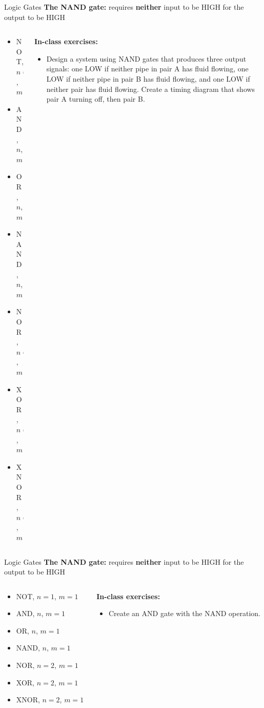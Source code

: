 \documentclass{beamer}
\begin{document}
\begin{frame}{Logic Gates}
\textbf{The NAND gate:} requires \textbf{neither} input to be HIGH for the output to be HIGH \\ \vspace{0.5cm}
\begin{columns}[T]
\begin{column}{0.5\textwidth}
\begin{itemize}
\item \alert{NOT, $n=1$, $m=1$}
\item \alert{AND, $n$, $m=1$}
\item \alert{OR, $n$, $m=1$}
\item \alert{NAND, $n$, $m=1$}
\item NOR, $n=2$, $m=1$
\item XOR, $n=2$, $m=1$
\item XNOR, $n=2$, $m=1$
\end{itemize}
\end{column}
\begin{column}{0.5\textwidth}
\small
\textbf{In-class exercises:}
\begin{itemize}
\item Design a system using NAND gates that produces three output signals: one LOW if neither pipe in pair A has fluid flowing, one LOW if neither pipe in pair B has fluid flowing, and one LOW if neither pair has fluid flowing.  Create a timing diagram that shows pair A turning off, then pair B.
\end{itemize}
\end{column}
\end{columns}
\end{frame}

\begin{frame}{Logic Gates}
\textbf{The NAND gate:} requires \textbf{neither} input to be HIGH for the output to be HIGH \\ \vspace{0.5cm}
\begin{columns}[T]
\begin{column}{0.5\textwidth}
\begin{itemize}
\item \alert{NOT, $n=1$, $m=1$}
\item \alert{AND, $n$, $m=1$}
\item \alert{OR, $n$, $m=1$}
\item \alert{NAND, $n$, $m=1$}
\item NOR, $n=2$, $m=1$
\item XOR, $n=2$, $m=1$
\item XNOR, $n=2$, $m=1$
\end{itemize}
\end{column}
\begin{column}{0.5\textwidth}
\small
\textbf{In-class exercises:}
\begin{itemize}
\item Create an AND gate with the NAND operation.
\end{itemize}
\end{column}
\end{columns}
\end{frame}
\end{document}
